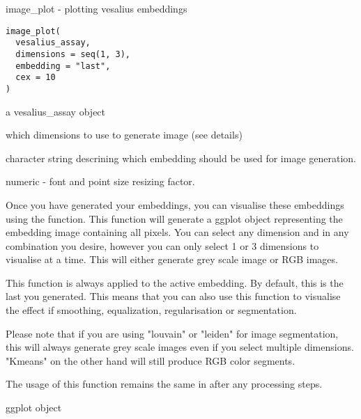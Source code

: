 \documentclass[a4paper]{book}
\begin{document}
%
\begin{Description}
image\_plot - plotting vesalius embeddings
\end{Description}
%
\begin{Usage}
\begin{verbatim}
image_plot(
  vesalius_assay,
  dimensions = seq(1, 3),
  embedding = "last",
  cex = 10
)
\end{verbatim}
\end{Usage}
%
\begin{Arguments}
\begin{ldescription}
\item[\code{vesalius\_assay}] a vesalius\_assay object

\item[\code{dimensions}] which dimensions to use to generate image (see details)

\item[\code{embedding}] character string descrining which embedding should be 
used for image generation.

\item[\code{cex}] numeric - font and point size resizing factor.
\end{ldescription}
\end{Arguments}
%
\begin{Details}
Once you have generated your embeddings, 
you can visualise these embeddings using the  function.
This function will generate a ggplot object representing the embedding 
image containing all pixels. You can select any dimension and in any 
combination you desire, however you can only select 1 or 3 dimensions 
to visualise at a time. This will either generate grey scale image 
or RGB images. 

This function is always applied to the active embedding. By default,
this is the last you generated. This means that you can also use
this function to visualise the effect if smoothing, equalization,
regularisation or segmentation. 

Please note that if you are using "louvain" or "leiden" for 
image segmentation, this will always generate grey scale images
even if you select multiple dimensions. "Kmeans" on the other hand 
will still produce RGB color segments.

The usage of this function remains the same in after any processing steps.
\end{Details}
%
\begin{Value}
ggplot object
\end{Value}
\end{document}
